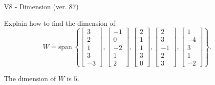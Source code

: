 \begin{exercise}
  \begin{exerciseTitle}V8 - Dimension (ver. 87)\end{exerciseTitle}
  \begin{exerciseStatement}
    Explain how to find the dimension of 
\[W=\mathrm{span}\ \left\{\left[\begin{array}{r}
3 \\
2 \\
1 \\
3 \\
-3
\end{array}\right] , \left[\begin{array}{r}
-1 \\
0 \\
-2 \\
1 \\
2
\end{array}\right] , \left[\begin{array}{r}
2 \\
1 \\
1 \\
3 \\
0
\end{array}\right] , \left[\begin{array}{r}
2 \\
3 \\
-1 \\
2 \\
3
\end{array}\right] , \left[\begin{array}{r}
1 \\
-4 \\
3 \\
1 \\
-2
\end{array}\right]\right\}.\]



  \end{exerciseStatement}
  \begin{exerciseAnswer}
   The dimension of \(W\) is  \(5\).
  


  \end{exerciseAnswer}
\end{exercise}